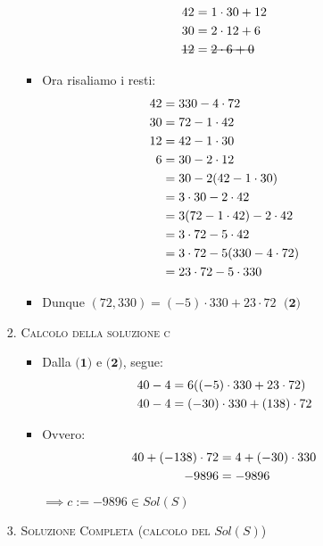 \documentclass[10pt]{article}
\begin{document}
\begin{itemize}
\begin{itemize}
\begin{enumerate}
\begin{itemize}
\begin{equation}
\begin{split}
	42 &= 1 \cdot 30 + 12 \\
	30 &= 2 \cdot 12 + 6 \\
	\hbox{\sout{$12$}} &= \hbox{\sout{$2 \cdot 6 + 0$}}
	\notag
	\end{split}
	\end{equation}
	\item
	Ora risaliamo i resti:
	\begin{equation}
	\begin{split}
	42 &= 330 -4 \cdot 72 \\
	30 &= 72 - 1 \cdot 42 \\
	12 &= 42 - 1 \cdot 30 \\
	6 &= 30 - 2 \cdot 12 \\
	&= 30 - 2(42-1 \cdot 30) \\
	&= 3 \cdot 30 - 2 \cdot 42 \\
	&= 3(72 - 1 \cdot 42) - 2 \cdot 42 \\
	&= 3 \cdot 72 - 5 \cdot 42 \\
	&= 3 \cdot 72 - 5(330 -4 \cdot 72) \\
	&= 23 \cdot 72 - 5 \cdot 330
	\notag
	\end{split}
	\end{equation}
	\item
	Dunque $(72,330) = (-5) \cdot 330 + 23 \cdot 72$ $\;\textbf{(2)}$\smallskip \smallskip
	\end{itemize}
	\item
	\textsc{Calcolo della soluzione c}
	\begin{itemize}
	\item
	Dalla $\textbf{(1)}$ e $\textbf{(2)}$, segue:
	\begin{equation}
	\begin{split}
	40 - 4 &= 6((-5) \cdot 330 + 23 \cdot 72) \\
	40 - 4 &= (-30) \cdot 330 + (138) \cdot 72
	\notag
	\end{split}
	\end{equation}
	\item
	Ovvero:
	\begin{equation}
	\begin{split}
	40 + (-138) \cdot 72 &= 4 + (-30) \cdot 330 \\
	-9896 &= -9896
	\notag
	\end{split}
	\end{equation}
	$\implies c := -9896 \in Sol(S)$
	\end{itemize}
	\item
	\textsc{Soluzione Completa (calcolo del $Sol(S)$)}

\end{enumerate}
\end{itemize}
\end{itemize}
\end{document}
